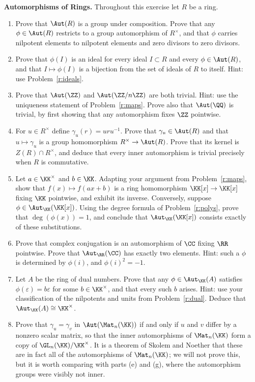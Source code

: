 \documentclass[12pt,reqno]{amsart}
\begin{document}
\begin{problems}
\item\label{r:auto} \textbf{Automorphisms of Rings.} Throughout this exercise let $R$ be a ring.
\begin{enumerate}
\item Prove that $\Aut(R)$ is a group under composition. Prove that any $\phi\in\Aut(R)$ restricts to a group automorphism of $R^\times$, and that $\phi$ carries nilpotent elements to nilpotent elements and zero divisors to zero divisors.
\item Prove that $\phi(I)$ is an ideal for every ideal $I\subset R$ and every $\phi\in\Aut(R)$, and that $I\mapsto\phi(I)$ is a bijection from the set of ideals of $R$ to itself. Hint: use Problem~\ref{r:ideals}.
\item Prove that $\Aut(\ZZ)$ and $\Aut(\ZZ/n\ZZ)$ are both trivial. Hint: use the uniqueness statement of Problem~\ref{r:maps}. Prove also that $\Aut(\QQ)$ is trivial, by first showing that any automorphism fixes $\ZZ$ pointwise.
\item For $u\in R^\times$ define $\gamma_u(r)=uru^{-1}$. Prove that $\gamma_u\in\Aut(R)$ and that $u\mapsto\gamma_u$ is a group homomorphism $R^\times\to\Aut(R)$. Prove that its kernel is $Z(R)\cap R^\times$, and deduce that every inner automorphism is trivial precisely when $R$ is commutative.
\item Let $a\in\KK^\times$ and $b\in\KK$. Adapting your argument from Problem~\ref{r:maps}, show that $f(x)\mapsto f(ax+b)$ is a ring homomorphism $\KK[x]\to\KK[x]$ fixing $\KK$ pointwise, and exhibit its inverse. Conversely, suppose $\phi\in\Aut_\KK(\KK[x])$. Using the degree formula of Problem~\ref{r:polys}, prove that $\deg(\phi(x))=1$, and conclude that $\Aut_\KK(\KK[x])$ consists exactly of these substitutions.
\item Prove that complex conjugation is an automorphism of $\CC$ fixing $\RR$ pointwise. Prove that $\Aut_\RR(\CC)$ has exactly two elements. Hint: such a $\phi$ is determined by $\phi(i)$, and $\phi(i)^2=-1$.
\item Let $A$ be the ring of dual numbers. Prove that any $\phi\in\Aut_\KK(A)$ satisfies $\phi(\varepsilon)=b\varepsilon$ for some $b\in\KK^\times$, and that every such $b$ arises. Hint: use your classification of the nilpotents and units from Problem~\ref{r:dual}. Deduce that $\Aut_\KK(A)\cong\KK^\times$.
\item Prove that $\gamma_u=\gamma_v$ in $\Aut(\Mat_n(\KK))$ if and only if $u$ and $v$ differ by a nonzero scalar matrix, so that the inner automorphisms of $\Mat_n(\KK)$ form a copy of $\GL_n(\KK)/\KK^\times$. It is a theorem of Skolem and Noether that these are in fact all of the automorphisms of $\Mat_n(\KK)$; we will not prove this, but it is worth comparing with parts (e) and (g), where the automorphism groups were visibly not inner.
\end{enumerate}
\end{problems}
 
\end{document}
